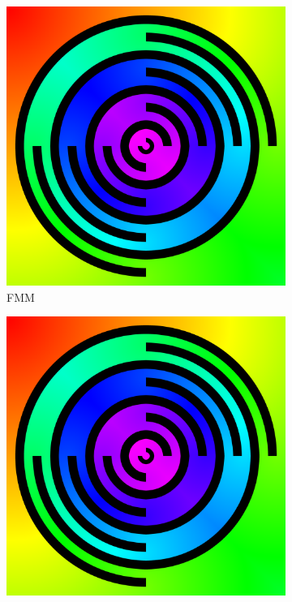 \documentclass[11pt]{article}       %
\begin{document}
\begin{figure}
	\begin{subfigure}[b]{.3\columnwidth}
		\includegraphics[width=\textwidth]{Figures/fmm_7_rings}
		\caption{FMM}
	\end{subfigure}
	\begin{subfigure}[b]{.3\columnwidth}
		\includegraphics[width=\textwidth]{Figures/fim_7_rings}

\end{subfigure}
\end{figure}
\end{document}
